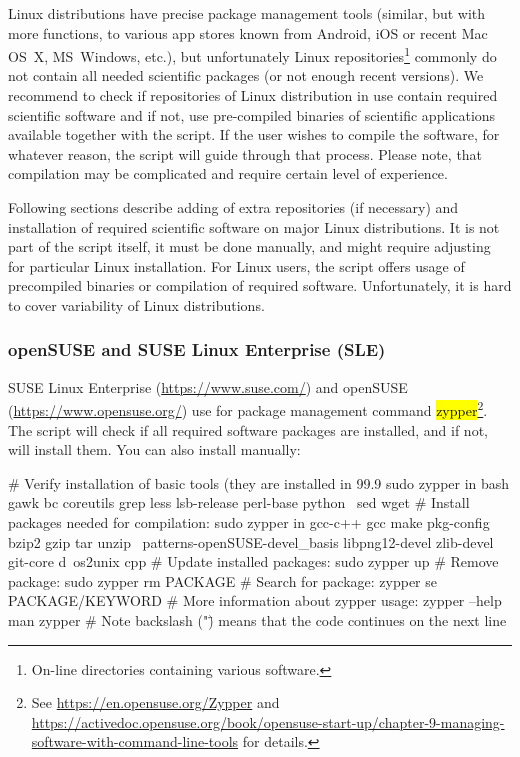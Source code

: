 \documentclass[a4paper, 11pt, twoside]{article}
\renewcommand{\texttt}[1]{\hl{\ttfamily #1}}
\begin{document}
Linux distributions have precise package management tools (similar, but with more functions, to various app stores known from Android, iOS or recent Mac OS~X, MS~Windows, etc.), but unfortunately Linux repositories\footnote{On-line directories containing various software.} commonly do not contain all needed scientific packages (or not enough recent versions). We recommend to check if repositories of Linux distribution in use contain required scientific software and if not, use pre-compiled binaries of scientific applications available together with the script. If the user wishes to compile the software, for whatever reason, the script will guide through that process. Please note, that compilation may be complicated and require certain level of experience.

Following sections describe adding of extra repositories (if necessary) and installation of required scientific software on major Linux distributions. It is not part of the script itself, it must be done manually, and might require adjusting for particular Linux installation. For Linux users, the script offers usage of precompiled binaries or compilation of required software. Unfortunately, it is hard to cover variability of Linux distributions.

\subsubsection{openSUSE and SUSE Linux Enterprise (SLE)}

SUSE Linux Enterprise (\url{https://www.suse.com/}) and openSUSE (\url{https://www.opensuse.org/}) use for package management command \texttt{zypper}\footnote{See \url{https://en.opensuse.org/Zypper} and \url{https://activedoc.opensuse.org/book/opensuse-start-up/chapter-9-managing-software-with-command-line-tools} for details.}. The script will check if all required software packages are installed, and if not, will install them. You can also install manually:

\begin{bashcode}
  # Verify installation of basic tools (they are installed in 99.9%
  sudo zypper in bash gawk bc coreutils grep less lsb-release perl-base python \
    sed wget
  # Install packages needed for compilation:
  sudo zypper in gcc-c++ gcc make pkg-config bzip2 gzip tar unzip \
    patterns-openSUSE-devel_basis libpng12-devel zlib-devel git-core d\
    os2unix cpp
  # Update installed packages:
  sudo zypper up
  # Remove package:
  sudo zypper rm PACKAGE
  # Search for package:
  zypper se PACKAGE/KEYWORD
  # More information about zypper usage:
  zypper --help
  man zypper
  # Note backslash ("\") means that the code continues on the next line
\end{bashcode}
\end{document}
